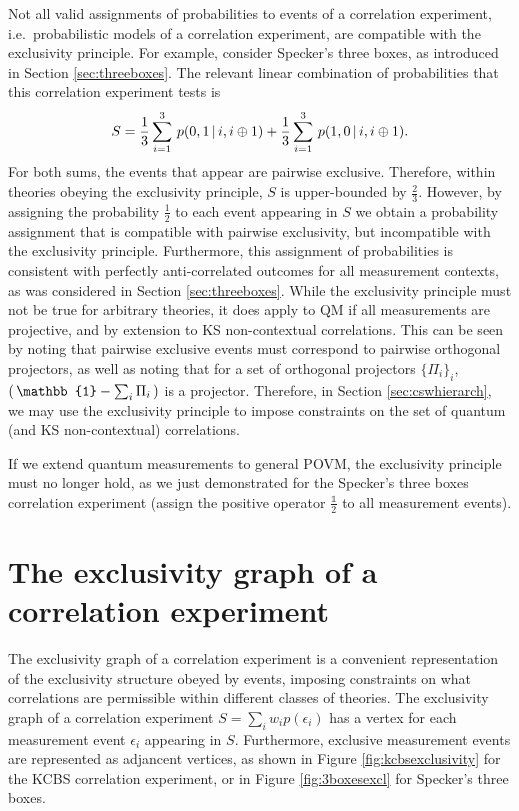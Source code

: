 Not all valid assignments of probabilities to events of a correlation experiment, i.e.\ probabilistic models of a correlation experiment, are compatible with the exclusivity principle. For example, consider Specker's three boxes, as introduced in Section \ref{sec:threeboxes}. The relevant linear combination of probabilities that this correlation experiment tests is
\begin{equation*}
S = \frac{1}{3}\sum_{i=1}^3\thinspace p(0,1 \thinspace\vert\thinspace i,i\oplus 1) +  \frac{1}{3}\sum_{i=1}^3\thinspace p(1,0\thinspace\vert\thinspace i,i\oplus 1).
\end{equation*}
For both sums, the events that appear are pairwise exclusive. Therefore, within theories obeying the exclusivity principle, $S$ is upper-bounded by $\frac{2}{3}$. However, by assigning the probability $\frac{1}{2}$ to each event appearing in $S$ we obtain a probability assignment that is compatible with pairwise exclusivity, but incompatible with the exclusivity principle. Furthermore, this assignment of probabilities is consistent with perfectly anti-correlated outcomes for all measurement contexts, as was considered in Section \ref{sec:threeboxes}.
While the exclusivity principle must not be true for arbitrary theories, it does apply to QM if all measurements are projective, and by extension to KS non-contextual correlations. This can be seen by noting that pairwise exclusive events must correspond to pairwise orthogonal projectors, as well as noting that for a set of orthogonal projectors $\{\Pi_i\}_i$, $(\thinspace\mathbb{1}-\sum_i \Pi_i\thinspace)$ is a projector.
Therefore, in Section \ref{sec:cswhierarch}, we may use the exclusivity principle to impose constraints on the set of quantum (and KS non-contextual) correlations.

If we extend quantum measurements to general POVM, the exclusivity principle must no longer hold, as we just demonstrated for the Specker's three boxes correlation experiment (assign the positive operator $\frac{\mathbb{1}}{2}$ to all measurement events).

\section{The exclusivity graph of a correlation experiment}
The exclusivity graph of a correlation experiment is a convenient representation of the exclusivity structure obeyed by events, imposing constraints on what correlations are permissible within different classes of theories. 
The exclusivity graph of a correlation experiment $S=\sum_i w_i p(\epsilon_i)$ has a vertex for each measurement event $\epsilon_i$ appearing in $S$.  Furthermore, exclusive measurement events are represented as adjancent vertices, as shown in Figure \ref{fig:kcbsexclusivity} for the KCBS correlation experiment, or in Figure \ref{fig:3boxesexcl} for Specker's three boxes.


